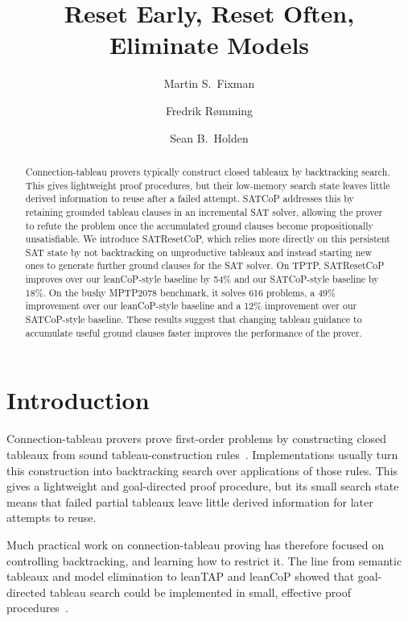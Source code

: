 \documentclass{EasyChair3.5/easychair}
\title{Reset Early, Reset Often, Eliminate Models}
\author{Martin S.\ Fixman\inst{1} \and Fredrik Rømming\inst{2} \and Sean B.\ Holden\inst{3}}
\institute{
	University of Cambridge, \\
	United Kingdom \\
	{}\inst{1}\email{msf43@cl.cam.ac.uk} \qquad\quad {}\inst{2}\email{fr409@cl.cam.ac.uk} \qquad\quad {}\inst{3}\email{sbh11@cl.cam.ac.uk}
}
\newcommand{\cop}[1]{\textsf{#1}}
\begin{document}
\maketitle{}

\begin{abstract}
	Connection-tableau provers typically construct closed tableaux by backtracking search.
	This gives lightweight proof procedures, but their low-memory search state leaves little derived information to reuse after a failed attempt.
	\cop{SATCoP} addresses this by retaining grounded tableau clauses in an incremental SAT solver, allowing the prover to refute the problem once the accumulated ground clauses become propositionally unsatisfiable.
	We introduce \cop{SATResetCoP}, which relies more directly on this persistent SAT state by not backtracking on unproductive tableaux and instead starting new ones to generate further ground clauses for the SAT solver.
	On TPTP, \cop{SATResetCoP} improves over our \cop{leanCoP}-style baseline by 54\% and our \cop{SATCoP}-style baseline by 18\%.
	On the bushy \cop{MPTP2078} benchmark, it solves \num{616} problems, a 49\% improvement over our \cop{leanCoP}-style baseline and a 12\% improvement over our \cop{SATCoP}-style baseline.
	These results suggest that changing tableau guidance to accumulate useful ground clauses faster improves the performance of the prover.
\end{abstract}



\section{Introduction}
Connection-tableau provers prove first-order problems by constructing closed tableaux from sound tableau-construction rules~\cite{connectiontableaux}.
Implementations usually turn this construction into backtracking search over applications of those rules.
This gives a lightweight and goal-directed proof procedure, but its small search state means that failed partial tableaux leave little derived information for later attempts to reuse.

Much practical work on connection-tableau proving has therefore focused on controlling backtracking, and learning how to restrict it.
The line from semantic tableaux and model elimination to \cop{leanTAP} and \cop{leanCoP} showed that goal-directed tableau search could be implemented in small, effective proof procedures~\cite{semantictableaux,modelelimination,leantap,leancop}.
\end{document}
